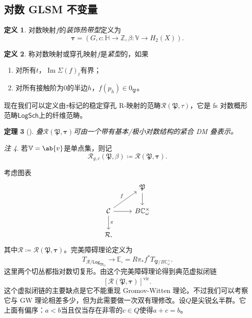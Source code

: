 \documentclass{amsart}
\newtheorem{thm}{定理}[section]
\theoremstyle{definition}
\newtheorem{defn}[thm]{定义}
\theoremstyle{remark}
\newtheorem{rmk}[thm]{注}
\theoremstyle{plain}
\theoremstyle{definition}
\theoremstyle{remark}
\DeclareMathOperator{\Ima}{Im}
\newcommand{\C}{\mathbb{C}}
\newcommand{\Z}{\mathbb{Z}}
\newcommand{\E}{\mathbb{E}}
\newcommand{\V}{\mathbb{V}}
\renewcommand{\H}{\mathbb{H}}
\newcommand{\mc}[1]{\mathcal{#1}}
\newcommand{\mf}[1]{\mathfrak{#1}}
\newcommand{\mr}[1]{\mathrm{#1}}
\newcommand{\ms}[1]{\mathsf{#1}}
\newcommand{\1}{\mathbf{1}}
\newcommand{\2}{\mathbf{2}}
\newcommand{\3}{\mathbf{3}}
\newcommand{\vir}{\mr{vir}}
\begin{document}
\subsection{对数 GLSM 不变量}%
\label{sub:Log GLSM invariants}

\begin{defn}
    对数映射\(f\)的\textit{装饰热带型}定义为
    \[ \bm{\tau} = (G, c \colon \H \to \Z, \beta \colon \V \to H_2(X)). \]
\end{defn}

\begin{defn}
    称对数映射或穿孔映射\(f\)是\textit{紧型}的，如果
    \begin{enumerate}
        \item 对所有\(t\)，\(\Ima \Sigma(f)_t\)有界；
        \item 对所有接触阶为\(0\)的半边\(h\)，\(f(p_h) \in 0_{\mf{P}}\)。
    \end{enumerate}
\end{defn}

现在我们可以定义由\(\tau\)标记的稳定穿孔 R-映射的范畴\(\mc{R}(\mf{P}, \tau)\)，它是 fs 对数概形范畴\(\ms{LogSch}\)上的纤维范畴。

\begin{thm}[{\cite{CJR2021,CJRpunctured}}]
    叠\(\mc{R}(\mf{P},\bm{\tau})\)可由一个带有基本/极小对数结构的紧合 DM 叠表示。
\end{thm}

\begin{rmk}
    若\(\V = \ab\{v\}\)是单点集，则记
    \[ \mc{R}_{g, c}(\mf{P}, \beta) \coloneqq \mc{R}(\mf{P}, \bm{\tau}). \]
\end{rmk}

考虑图表
\begin{equation*}
\begin{tikzcd}
    & \mf{P} \ar{d} \\
    \mc{C} \ar{ur}{f} \ar{d}{\pi} \ar{r} & B \C_{\omega}^{\times} \\
    \mc{R},
\end{tikzcd}
\end{equation*}
其中\(\mc{R} \coloneqq \mc{R}(\mf{P}, \bm{\tau})\)。完美障碍理论定义为
\[ T_{\mc{R}/\ms{Log}_{\mf{M}_G}} \to \E_{\square} = R \pi_* f^* T_{\mf{P}/B\C_{\omega}^{\times}}. \]
这里两个切丛都指对数切复形。由这个完美障碍理论得到典范虚拟闭链
\[ [\mc{R}(\mf{P}, \bm{\tau})]^{\vir}. \]
这个虚拟闭链的主要缺点是它不能重现 Gromov-Witten 理论。不过我们可以考察它与 GW 理论相差多少，但为此需要做一次双有理修改。设\(Q\)是尖锐幺半群。它上面有偏序：\(a < b\)当且仅当存在非零的\(c \in Q\)使得\(a+c = b\)。
\end{document}
